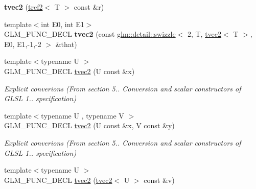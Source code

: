 \begin{DoxyCompactItemize}
\item 
\hypertarget{structglm_1_1detail_1_1tvec2_a343fdf7daa477b63a88aab1a61c1d83a}{{\bfseries tvec2} (\hyperlink{structglm_1_1detail_1_1tref2}{tref2}$<$ T $>$ const \&r)}\label{structglm_1_1detail_1_1tvec2_a343fdf7daa477b63a88aab1a61c1d83a}

\item 
\hypertarget{structglm_1_1detail_1_1tvec2_add0938d9c87c7a301ee3f49d8a0b4eb5}{{\footnotesize template$<$int E0, int E1$>$ }\\G\-L\-M\-\_\-\-F\-U\-N\-C\-\_\-\-D\-E\-C\-L {\bfseries tvec2} (const \hyperlink{structglm_1_1detail_1_1swizzle}{glm\-::detail\-::swizzle}$<$ 2, T, \hyperlink{structglm_1_1detail_1_1tvec2}{tvec2}$<$ T $>$, E0, E1,-\/1,-\/2 $>$ \&that)}\label{structglm_1_1detail_1_1tvec2_add0938d9c87c7a301ee3f49d8a0b4eb5}

\item 
\hypertarget{structglm_1_1detail_1_1tvec2_a877ab37ed04a0e66ae553a13d0c3d820}{{\footnotesize template$<$typename U $>$ }\\G\-L\-M\-\_\-\-F\-U\-N\-C\-\_\-\-D\-E\-C\-L \hyperlink{structglm_1_1detail_1_1tvec2_a877ab37ed04a0e66ae553a13d0c3d820}{tvec2} (U const \&x)}\label{structglm_1_1detail_1_1tvec2_a877ab37ed04a0e66ae553a13d0c3d820}

\begin{DoxyCompactList}\small\item\em Explicit converions (From section 5.. Conversion and scalar constructors of G\-L\-S\-L 1.. specification) \end{DoxyCompactList}\item 
\hypertarget{structglm_1_1detail_1_1tvec2_a074ee042e18f4a7ec3d40f1f2b96d94e}{{\footnotesize template$<$typename U , typename V $>$ }\\G\-L\-M\-\_\-\-F\-U\-N\-C\-\_\-\-D\-E\-C\-L \hyperlink{structglm_1_1detail_1_1tvec2_a074ee042e18f4a7ec3d40f1f2b96d94e}{tvec2} (U const \&x, V const \&y)}\label{structglm_1_1detail_1_1tvec2_a074ee042e18f4a7ec3d40f1f2b96d94e}

\begin{DoxyCompactList}\small\item\em Explicit converions (From section 5.. Conversion and scalar constructors of G\-L\-S\-L 1.. specification) \end{DoxyCompactList}\item 
\hypertarget{structglm_1_1detail_1_1tvec2_ac606857971b3d9ffcb9991647dc556c3}{{\footnotesize template$<$typename U $>$ }\\G\-L\-M\-\_\-\-F\-U\-N\-C\-\_\-\-D\-E\-C\-L \hyperlink{structglm_1_1detail_1_1tvec2_ac606857971b3d9ffcb9991647dc556c3}{tvec2} (\hyperlink{structglm_1_1detail_1_1tvec2}{tvec2}$<$ U $>$ const \&v)}\label{structglm_1_1detail_1_1tvec2_ac606857971b3d9ffcb9991647dc556c3}


\end{DoxyCompactItemize}
